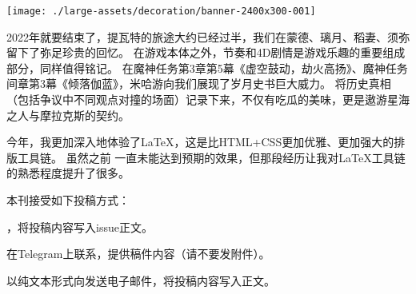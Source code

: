 


\noindent\texttt{[image: ./large-assets/decoration/banner-2400x300-001]}\par
\tableofcontents\clearpage






\dividearticles
{}

2022年就要结束了，提瓦特的旅途大约已经过半，我们在蒙德、璃月、稻妻、须弥留下了弥足珍贵的回忆。
在游戏本体之外，节奏和4D剧情是游戏乐趣的重要组成部分，同样值得铭记。
在魔神任务第3章第5幕《虚空鼓动，劫火高扬》、魔神任务间章第3幕《倾落伽蓝》，米哈游向我们展现了岁月史书巨大威力。
将历史真相（包括争议中不同观点对撞的场面）记录下来，不仅有吃瓜的美味，更是遨游星海之人与摩拉克斯的契约。

今年，我更加深入地体验了LaTeX，这是比HTML+CSS更加优雅、更加强大的排版工具链。
虽然之前\href{https://neruthesgithubdistweb.vercel.app/qyxt/qyxt/qyxt-2022-02.pdf}{}%
一直未能达到预期的效果，但那段经历让我对LaTeX工具链的熟悉程度提升了很多。


本刊接受如下投稿方式：

\begin{compactitem}
	\item \href{https://github.com/neruthes/ysplayerjournal}{}，将投稿内容写入issue正文。
	\item 在Telegram上联系\CJKecglue\href{https://t.me/neruthes}{}，提供稿件内容（请不要发附件）。
	\item 以纯文本形式向发送电子邮件，将投稿内容写入正文。
\end{compactitem}

